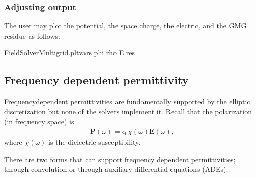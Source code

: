 \documentclass[letterpaper,10pt,english]{sphinxmanual}
\begin{document}
\subsubsection{Adjusting output}
\label{\detokenize{Solvers/Electrostatics:adjusting-output}}
\sphinxAtStartPar
The user may plot the potential, the space charge, the electric, and the GMG residue as follows:

\begin{sphinxVerbatim}[commandchars=\\\{\},formatcom=\scriptsize]
FieldSolverMultigrid.plt\PYGZus{}vars   phi rho E res     
\end{sphinxVerbatim}


\subsection{Frequency dependent permittivity}
\label{\detokenize{Solvers/Electrostatics:frequency-dependent-permittivity}}
\sphinxAtStartPar
Frequency\sphinxhyphen{}dependent permittivities are fundamentally supported by the  elliptic discretization but none of the solvers implement it.
Recall that the polarization (in frequency space) is
\begin{equation*}
\begin{split}\mathbf{P}(\omega) = \epsilon_0\chi(\omega)\mathbf{E}(\omega),\end{split}
\end{equation*}
\sphinxAtStartPar
where \(\chi(\omega)\) is the dielectric susceptibility.

\sphinxAtStartPar
There are two forms that  can support frequency dependent permittivities; through convolution or through auxiliary differential equations (ADEs).
\end{document}
